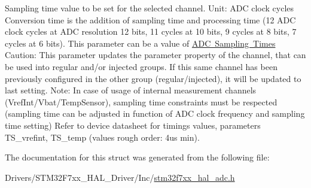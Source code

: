 Sampling time value to be set for the selected channel. Unit\+: A\+DC clock cycles Conversion time is the addition of sampling time and processing time (12 A\+DC clock cycles at A\+DC resolution 12 bits, 11 cycles at 10 bits, 9 cycles at 8 bits, 7 cycles at 6 bits). This parameter can be a value of \mbox{\hyperlink{group___a_d_c__sampling__times}{A\+DC Sampling Times}} Caution\+: This parameter updates the parameter property of the channel, that can be used into regular and/or injected groups. If this same channel has been previously configured in the other group (regular/injected), it will be updated to last setting. Note\+: In case of usage of internal measurement channels (Vref\+Int/\+Vbat/\+Temp\+Sensor), sampling time constraints must be respected (sampling time can be adjusted in function of A\+DC clock frequency and sampling time setting) Refer to device datasheet for timings values, parameters T\+S\+\_\+vrefint, T\+S\+\_\+temp (values rough order\+: 4us min). 

The documentation for this struct was generated from the following file\+:\begin{DoxyCompactItemize}
\item 
Drivers/\+S\+T\+M32\+F7xx\+\_\+\+H\+A\+L\+\_\+\+Driver/\+Inc/\mbox{\hyperlink{stm32f7xx__hal__adc_8h}{stm32f7xx\+\_\+hal\+\_\+adc.\+h}}\end{DoxyCompactItemize}
